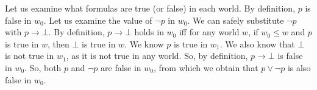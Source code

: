 {{Let us examine what formulas are true (or false) in each world. By
definition, $p$ is false in $w_0$. Let us examine the value of
$\neg p$ in $w_0$. We can safely substitute $\neg p$ with $p
\rightarrow \bot$. By definition, $p \rightarrow \bot$ holds in
$w_0$ iff for any world $w$, if $w_0 \leq w$ and $p$ is true in $w$,
then $\bot$ is true in $w$. We know $p$ is true in $w_1$. We also
know that $\bot$ is not true in $w_1$, as it is not true in any world.
So, by definition, $p \rightarrow \bot$ is false in $w_0$. So, both
$p$ and $\neg p$ are false in $w_0$, from which we obtain that $p
\lor \neg p$ is also false in $w_0$.

}} %
